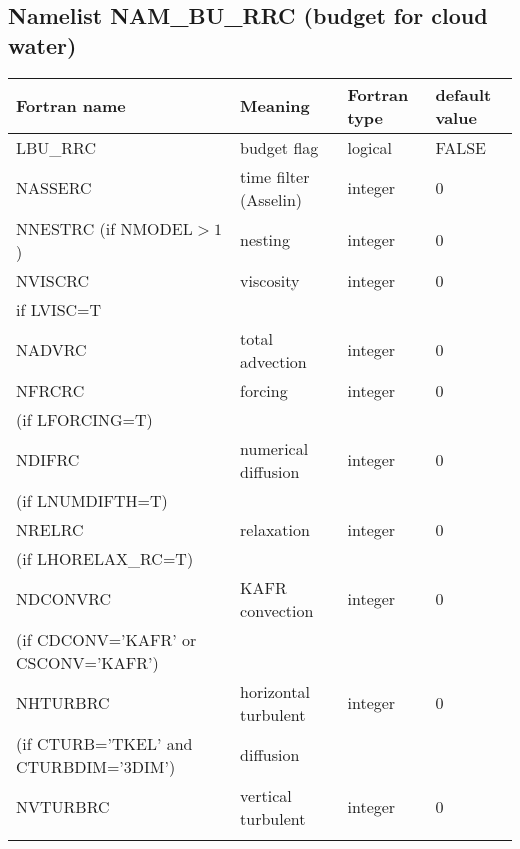 \newpage
\subsection{Namelist NAM\_BU\_RRC (budget for cloud water)}

\begin{longtable} {|p{}|p{}|>{\centering}p{}|p{}<{\centering}|}
\hline
Fortran name & Meaning & Fortran type & default value \\
\hline \hline
\endhead
LBU\_RRC & budget flag & logical & FALSE\index{LBU\_RRC!\innam{NAM\_BU\_RRC}} \\\hline
NASSERC  & time filter (Asselin)   & integer  &  0 \index{NASSERC!\innam{NAM\_BU\_RRC}} \\\hline
NNESTRC (if NMODEL$>1$) & nesting           & integer  &  0 \index{NNESTRC!\innam{NAM\_BU\_RRC}} \\\hline
NVISCRC  & viscosity         & integer  &  0 \index{NVISCRC!\innam{NAM\_BU\_RRC}}\\
if LVISC=T &  &   &   \\\hline
NADVRC   & total advection   & integer  &  0 \index{NADVRC!\innam{NAM\_BU\_RRC}}\\\hline
NFRCRC   & forcing           & integer  &  0 \index{NFRCRC!\innam{NAM\_BU\_RRC}} \\ \nopagebreak
(if LFORCING=T) &  &   &   \\\hline
NDIFRC   & numerical diffusion & integer  &  0 \index{NDIFRC!\innam{NAM\_BU\_RRC}}\\ \nopagebreak
(if LNUMDIFTH=T) &  &   &   \\\hline
NRELRC   & relaxation        & integer  &  0 \index{NRELRC!\innam{NAM\_BU\_RRC}}\\ \nopagebreak
(if LHORELAX\_RC=T) &  &   &   \\\hline
NDCONVRC & KAFR convection   & integer  &  0 \index{NDCONVRC!\innam{NAM\_BU\_RRC}} \\ \nopagebreak
(if CDCONV='KAFR' or CSCONV='KAFR') &  &   &   \\\hline
NHTURBRC & horizontal turbulent  & integer  &  0 \index{NHTURBRC!\innam{NAM\_BU\_RRC}}\\ \nopagebreak
(if CTURB='TKEL' and CTURBDIM='3DIM') &diffusion &   &  \\\hline
NVTURBRC & vertical turbulent  & integer  &  0 \index{NVTURBRC!\innam{NAM\_BU\_RRC}}\\ \nopagebreak

\end{longtable}
